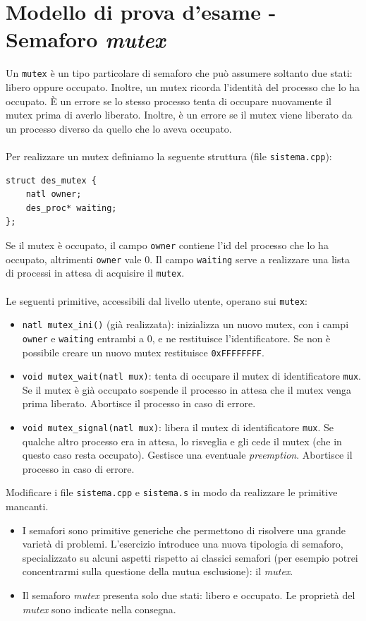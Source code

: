 \documentclass[11pt]{report}
\theoremstyle{definition}
\begin{document}
\part{Modello di prova d'esame - Semaforo \emph{mutex}}

\small
\begin{framed}
\noindent Un {\tt mutex} \`e un tipo particolare di semaforo che pu\`o assumere soltanto
due stati: libero oppure occupato.  Inoltre, un mutex ricorda l'identit\`a del
processo che lo ha occupato. \`E un errore se lo stesso processo tenta di
occupare nuovamente il mutex prima di averlo liberato. Inoltre, \`e un errore
se il mutex viene liberato da un processo diverso da quello che lo aveva
occupato.\\\\Per realizzare un mutex definiamo la seguente struttura (file {\tt sistema.cpp}):

\begin{verbatim}
struct des_mutex {
    natl owner;
    des_proc* waiting;
};
\end{verbatim}
\noindent Se il mutex \`e occupato, il campo {\tt owner} contiene l'id del processo che
lo ha occupato, altrimenti {\tt owner} vale 0.  Il campo {\tt waiting} serve a
realizzare una lista di processi in attesa di acquisire il {\tt mutex}.\\\\Le seguenti primitive, accessibili dal livello utente, operano sui {\tt mutex}:
\begin{itemize}
	\item \verb|natl mutex_ini()| (gi\`a realizzata): inizializza
	un nuovo mutex, con i campi {\tt owner} e {\tt waiting} entrambi a 0, e ne
	restituisce l'identificatore. Se non \`e possibile creare un nuovo mutex
	restituisce {\tt 0xFFFFFFFF}.
	\item \verb|void mutex_wait(natl mux)|: tenta di occupare il
	mutex di identificatore {\tt mux}.  Se il mutex \`e gi\`a occupato sospende il
	processo in attesa che il mutex venga prima liberato.  Abortisce il processo in
	caso di errore.
	\item \verb|void mutex_signal(natl mux)|: libera il mutex di
	identificatore {\tt mux}.  Se qualche altro processo era in attesa, lo
	risveglia e gli cede il mutex (che in questo caso resta occupato). Gestisce una
	eventuale {\em preemption}.  Abortisce il processo in caso di errore.
\end{itemize}
\noindent Modificare i file \verb|sistema.cpp| e \verb|sistema.s| in modo da realizzare
le primitive mancanti.\end{framed}
\normalsize 
\begin{itemize}
		\item I semafori sono primitive generiche che permettono di risolvere una grande varietà di problemi. L'esercizio introduce una nuova tipologia di semaforo, specializzato su alcuni aspetti rispetto ai classici semafori (per esempio potrei concentrarmi sulla questione della mutua esclusione): il \emph{mutex}.
	\item Il semaforo \emph{mutex} presenta solo due stati: libero e occupato. Le proprietà del \emph{mutex} sono indicate nella consegna.
\end{itemize}
\end{document}
